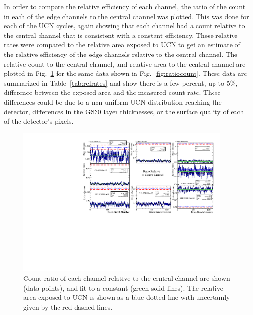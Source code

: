 \documentclass[letter,twocolumn,preprint,3p]{elsarticle}
\begin{document}
In order to compare the relative efficiency of each channel, the ratio
of the count in each of the edge channels to the central channel was
plotted.  This was done for each of the UCN cycles, again showing that
each channel had a count relative to the central channel that is
consistent with a constant efficiency.  These relative rates were
compared to the relative area exposed to UCN to get an estimate of the
relative efficiency of the edge channels relative to the central
channel.  The relative count to the central channel, and relative area
to the central channel are plotted in Fig.~\ref{fig:relratios} for the
same data shown in Fig.~\ref{fig:ratiocount}.  These data are
summarized in Table~\ref{tab:relrates} and show there is a few
percent, up to 5\%, difference between the exposed area and the
measured count rate.  These differences could be due to a non-uniform
UCN distribution reaching the detector, differences in the GS30 layer
thicknesses, or the surface quality of each of the detector's pixels.


\begin{figure}[!htpb]
\centering
\includegraphics[width=0.95\textwidth]{figures/relratios.pdf}
\caption{ Count ratio of each channel relative to the central channel
  are shown (data points), and fit to a constant (green-solid lines).
  The relative area exposed to UCN is shown as a blue-dotted line with
  uncertainly given by the red-dashed lines.}
\label{fig:relratios}
\end{figure}
\end{document}

